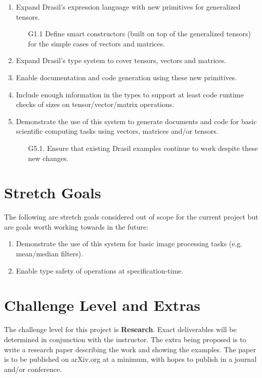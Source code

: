 \documentclass{article}
\begin{document}
\begin{enumerate}[label={G\arabic*.}]
    \item Expand Drasil's expression language with new primitives for generalized tensors.
    \begin{enumerate}
    \item[G1.1] Define smart constructors (built on top of the generalized tensors) for 
          the simple cases of vectors and matrices.
    \end{enumerate}
    \item Expand Drasil's type system to cover tensors, vectors and matrices.
    \item Enable documentation and code generation using these new primitives.
    \item Include enough information in the types to support at least code runtime 
          checks of sizes on tensor/vector/matrix operations.
    \item Demonstrate the use of this system to generate documents and code for basic 
          scientific computing tasks using vectors, matrices and/or tensors.
    \begin{itemize}
    \item[G5.1.] Ensure that existing Drasil examples continue to work despite these
          new changes.
    \end{itemize}
\end{enumerate}

\section{Stretch Goals}

The following are stretch goals considered out of scope for the current project but
are goals worth working towards in the future:

\begin{enumerate}[label={SG\arabic*.}]
\item Demonstrate the use of this system for basic image processing tasks (e.g. 
mean/median filters).
\item Enable type safety of operations at specification-time.
\end{enumerate}

\section{Challenge Level and Extras}

The challenge level for this project is \textbf{Research}. Exact deliverables will be
determined in conjunction with the instructor. The extra being proposed is to write
a research paper describing the work and showing the examples. The paper is to be
published on arXiv.org at a minimum, with hopes to publish in a journal and/or 
conference.
\end{document}
